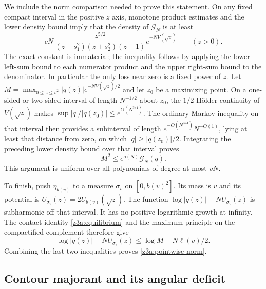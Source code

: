 \documentclass[11pt]{article}
\theoremstyle{definition}\newtheorem{definition}[theorem]{Definition}
\theoremstyle{remark}\newtheorem{remark}[theorem]{Remark}
\begin{document}
We include the norm comparison needed to prove this statement.  On any
fixed compact interval in the positive $z$ axis, monotone product estimates
and the lower density bound imply that the density of $\mathcal G_N$ is
at least
\[
 cN\,\frac{z^{5/2}}{(z+s_1^2)(z+s_2^2)(z+1)}
          e^{-NV(\sqrt z)}\qquad(z>0).
\]
The exact constant is immaterial; the inequality follows by applying
the lower left-sum bound to each numerator product and the upper
right-sum bound to the denominator.  In particular the only loss near
zero is a fixed power of $z$.
Let $M=\max_{0\le z\le b^2}|q(z)|e^{-NV(\sqrt z)/2}$ and let $z_0$
be a maximizing point.  On a one-sided or two-sided interval of length
$N^{-1/2}$ about $z_0$, the $1/2$-H\"older continuity of $V(\sqrt z)$
makes $\sup|q|/|q(z_0)|\le e^{O(N^{3/4})}$.  The ordinary Markov
inequality on that interval then provides a subinterval of length
$e^{-O(N^{3/4})}N^{-O(1)}$, lying at least that distance from zero,
on which $|q|\ge|q(z_0)|/2$.  Integrating the preceding lower density
bound over that interval proves
\[
 M^2\le e^{o(N)}\mathcal G_N(q).
\]
This argument is uniform over all polynomials of degree at most $vN$.

To finish, push $\eta_{b(v)}$ to a measure $\sigma_v$ on $[0,b(v)^2]$.
Its mass is $v$ and its potential is $U_{\sigma_v}(z)=2U_{b(v)}(\sqrt z)$.
The function $\log|q(z)|-NU_{\sigma_v}(z)$ is subharmonic off that interval.
It has no positive logarithmic growth at infinity.  The contact identity
\eqref{z3a:equilibrium} and the maximum principle on the compactified
complement therefore give
\[
 \log|q(z)|-NU_{\sigma_v}(z)\le\log M-N\ell(v)/2.
\]
Combining the last two inequalities proves \eqref{z3a:pointwise-norm}.


\subsection{Contour majorant and its angular deficit}
\end{document}
